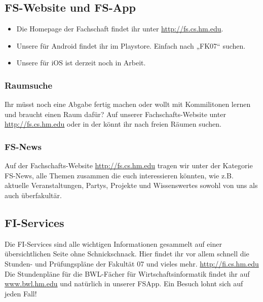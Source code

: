 \subsection{FS-Website und FS-App}
\begin{itemize}
	\item Die Homepage der Fachschaft findet ihr unter \url{http://fs.cs.hm.edu}.
	\item Unsere  für Android findet ihr im Playstore. 
	Einfach nach „FK07“ suchen.
	\item Unsere  für iOS ist derzeit noch in Arbeit.
\end{itemize}

\subsubsection{Raumsuche}
Ihr müsst noch eine Abgabe fertig machen oder wollt mit Kommilitonen 
lernen und braucht einen Raum dafür? Auf unserer Fachschafts-Website unter \url{http://fs.cs.hm.edu} \arrow {} \arrow {} oder in der
 könnt ihr nach freien Räumen suchen.

\subsubsection{FS-News}
Auf der Fachschafts-Website \url{http://fs.cs.hm.edu} tragen wir unter der Kategorie FS-News,
alle Themen zusammen die euch interessieren könnten, wie z.B. 
aktuelle Veranstaltungen, Partys, Projekte und Wissenswertes sowohl 
von uns als auch überfakultär. 

\subsection{FI-Services}
Die FI-Services sind alle wichtigen Informationen gesammelt auf einer 
übersichtlichen Seite ohne Schnickschnack. Hier findet ihr vor allem 
schnell die Stunden- und Prüfungspläne der Fakultät 07 und vieles mehr.
\url{http://fi.cs.hm.edu}\doublebreak
Die Stundenpläne für die BWL-Fächer für Wirtschaftsinformatik 
findet ihr auf \url{www.bwl.hm.edu} \arrow {} und natürlich in unserer FSApp.
Ein Besuch lohnt sich auf jeden Fall!

